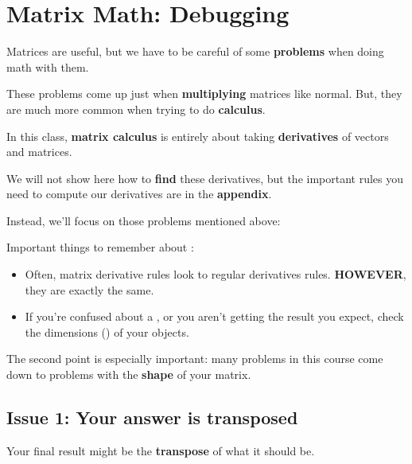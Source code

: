 \section*{Matrix Math: Debugging}

    Matrices are useful, but we have to be careful of some \textbf{problems} when doing math with them.
    
    These problems come up just when \textbf{multiplying} matrices like normal. But, they are much more common when trying to do \textbf{calculus}.
    
    In this class, \textbf{matrix calculus} is entirely about taking \textbf{derivatives} of vectors and matrices.
    
    We will not show here how to \textbf{find} these derivatives, but the important rules you need to compute our derivatives are in the \textbf{appendix}.
    
    Instead, we'll focus on those problems mentioned above:\\
    
    \begin{concept}
        
        Important things to remember about :
    
        \begin{itemize}
            \item Often, matrix derivative rules look  to regular derivatives rules. \textbf{HOWEVER}, they are  exactly the same.
            
            \item If you're confused about a , or you aren't getting the result you expect, check the dimensions () of your objects.
        \end{itemize}
    \end{concept}
    
    The second point is especially important: many problems in this course come down to problems with the \textbf{shape} of your matrix.
    
    \subsection*{Issue 1: Your answer is transposed}

        Your final result might be the \textbf{transpose} of what it should be.
        
